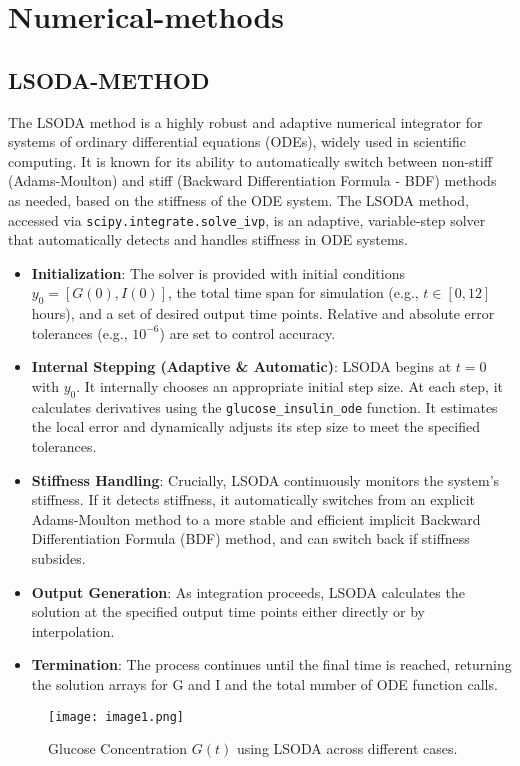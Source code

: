 \documentclass[conference]{IEEEtran}
\begin{document}
\section{Numerical-methods}

\subsection{LSODA-METHOD}

The LSODA method is a highly robust and adaptive numerical integrator for systems of ordinary differential equations (ODEs), widely used in scientific computing. It is known for its ability to automatically switch between non-stiff (Adams-Moulton) and stiff (Backward Differentiation Formula - BDF) methods as needed, based on the stiffness of the ODE system. 
The LSODA method, accessed via \texttt{scipy.integrate.solve\_ivp}, is an adaptive, variable-step solver that automatically detects and handles stiffness in ODE systems.

\begin{itemize}
    \item \textbf{Initialization}: The solver is provided with initial conditions $y_0 = [G(0), I(0)]$, the total time span for simulation (e.g., $t \in [0, 12]$ hours), and a set of desired output time points. Relative and absolute error tolerances (e.g., $10^{-6}$) are set to control accuracy.
    \item \textbf{Internal Stepping (Adaptive \& Automatic)}: LSODA begins at $t=0$ with $y_0$. It internally chooses an appropriate initial step size. At each step, it calculates derivatives using the \texttt{glucose\_insulin\_ode} function. It estimates the local error and dynamically adjusts its step size to meet the specified tolerances.
    \item \textbf{Stiffness Handling}: Crucially, LSODA continuously monitors the system's stiffness. If it detects stiffness, it automatically switches from an explicit Adams-Moulton method to a more stable and efficient implicit Backward Differentiation Formula (BDF) method, and can switch back if stiffness subsides.
    \item \textbf{Output Generation}: As integration proceeds, LSODA calculates the solution at the specified output time points either directly or by interpolation.
    \item \textbf{Termination}: The process continues until the final time is reached, returning the solution arrays for G and I and the total number of ODE function calls.
\end{itemize}
\begin{figure}[H]
    \centering
    \texttt{[image: image1.png]} 
    \caption{Glucose Concentration $G(t)$ using LSODA across different cases.}
    \label{fig:lsoda_glucose}
\end{figure}
\end{document}
